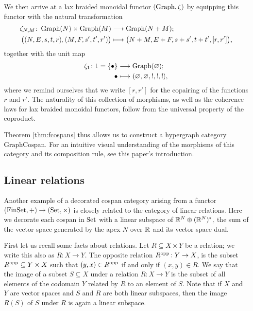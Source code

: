 We then arrive at a lax braided monoidal functor $(\operatorname{Graph},\zeta)$ by equipping
this functor with the natural transformation 
\begin{align*}
  \zeta_{N,M}\colon  \operatorname{Graph}(N) \times \operatorname{Graph}(M)
  &\longrightarrow \operatorname{Graph}(N+M); \\
  \big( (N,E,s,t,r), (M,F,s',t',r') \big) &\longmapsto
  \big(N+M,E+F,s+s',t+t',[r,r']\big),
\end{align*}
together with the unit map
\begin{align*}
  \zeta_1\colon  1=\{\bullet\} &\longrightarrow \operatorname{Graph}(\varnothing); \\
  \bullet &\longmapsto
  (\varnothing,\varnothing,!,!,!),
\end{align*}
where we remind ourselves
that we write $[r,r']$ for the copairing of the functions $r$ and $r'$. The
naturality of this collection of morphisms, as well as the coherence laws for
lax braided monoidal functors, follow from the universal property of the coproduct.

Theorem \ref{thm:fcospans} thus allows us to construct a hypergraph category
$\mathrm{GraphCospan}$.  For an intuitive visual understanding of the morphisms
of this category and its composition rule, see this paper's introduction.

\subsection{Linear relations}
Another example of a decorated cospan category arising from a functor $(\mathrm{FinSet},+)
\to (\mathrm{Set}, \times)$ is closely related to the category of linear relations. Here
we decorate each cospan in $\mathrm{Set}$ with a linear subspace of ${\mathbb{R}}^N \oplus
({\mathbb{R}}^N)^\ast$, the sum of the vector space generated by the apex $N$ over ${\mathbb{R}}$
and its vector space dual.

First let us recall some facts about relations. Let $R \subseteq X\times Y$ be
a relation; we write this also as $R\colon  X \to Y$. The opposite relation $R^{\mathrm{opp}}\colon 
Y\to X$, is the subset $R^{\mathrm{opp}} \subseteq Y\times X$ such that $(y,x) \in R^{\mathrm{opp}}$
if and only if $(x,y) \in R$. We say that the image of a subset $S \subseteq X$
under a relation $R\colon  X \to Y$ is the subset of all elements of the codomain $Y$
related by $R$ to an element of $S$. Note that if $X$ and $Y$ are vector spaces
and $S$ and $R$ are both linear subspaces, then the image $R(S)$ of $S$ under
$R$ is again a linear subspace.

